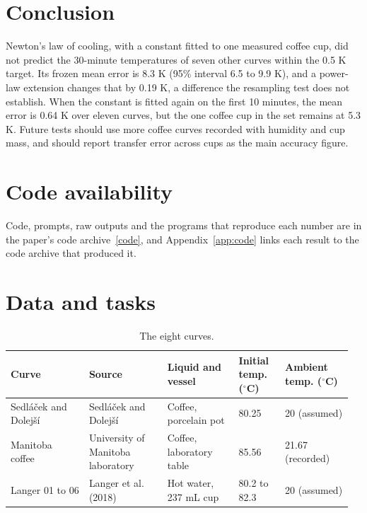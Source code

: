\documentclass[11pt,letterpaper]{article}
\begin{document}
\section{Conclusion}

Newton's law of cooling, with a constant fitted to one measured coffee cup, did not predict the 30-minute temperatures of seven other curves within the 0.5 K target. Its frozen mean error is 8.3 K (95\% interval 6.5 to 9.9 K), and a power-law extension changes that by 0.19 K, a difference the resampling test does not establish. When the constant is fitted again on the first 10 minutes, the mean error is 0.64 K over eleven curves, but the one coffee cup in the set remains at 5.3 K. Future tests should use more coffee curves recorded with humidity and cup mass, and should report transfer error across cups as the main accuracy figure.

\section*{Code availability}

Code, prompts, raw outputs and the programs that reproduce each number are in the paper's code archive~\href{https://github.com/ai-inventor-papers/ai-invention-5821c4-newtons-cooling-law-for-coffee-over-30/tree/main}{[code]}, and Appendix~\ref{app:code} links each result to the code archive that produced it.




\clearpage
\appendix

\section{Data and tasks}\label{app:data}

\begin{table}[!htbp]
  \centering
  \caption{The eight curves.}
  \label{tab:data}
  \begin{tabular}{p{0.22\linewidth}p{0.22\linewidth}p{0.20\linewidth}p{0.13\linewidth}p{0.19\linewidth}}
    \toprule
    Curve & Source & Liquid and vessel & Initial temp. ($^\circ$C) & Ambient temp. ($^\circ$C) \\
    \midrule
    Sedláček and Dolejší & Sedláček and Dolejší & Coffee, porcelain pot & 80.25 & 20 (assumed) \\
    Manitoba coffee & University of Manitoba laboratory & Coffee, laboratory table & 85.56 & 21.67 (recorded) \\
    Langer 01 to 06 & Langer et al. (2018) & Hot water, 237 mL cup & 80.2 to 82.3 & 20 (assumed) \\
    \bottomrule
  \end{tabular}
\end{table}
\end{document}
